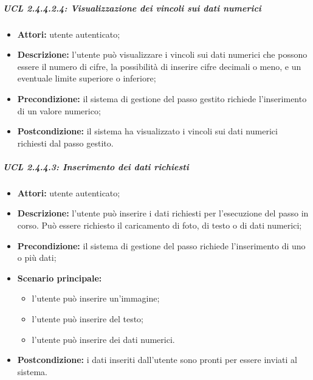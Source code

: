 \subparagraph{UCL 2.4.4.2.4: Visualizzazione dei vincoli sui dati numerici}
\begin{itemize}
\item \textbf{Attori:} utente autenticato;
\item \textbf{Descrizione:} l'utente può visualizzare i vincoli sui dati numerici che possono essere il numero di cifre, la possibilità di inserire cifre decimali o meno, e un eventuale limite superiore o inferiore;
\item \textbf{Precondizione:} il sistema di gestione del passo gestito richiede l'inserimento di un valore numerico;
\item \textbf{Postcondizione:} il sistema ha visualizzato i vincoli sui dati numerici richiesti dal passo gestito.
\end{itemize}

\subparagraph{UCL 2.4.4.3: Inserimento dei dati richiesti}
\begin{itemize}
\item \textbf{Attori:} utente autenticato;
\item \textbf{Descrizione:} l'utente può inserire i dati richiesti per l'esecuzione del passo in corso. Può essere richiesto il caricamento di foto, di testo o di dati numerici; 
\item \textbf{Precondizione:} il sistema di gestione del passo richiede l'inserimento di uno o più dati;
\item \textbf{Scenario principale:}
\begin{itemize}
\item l'utente può inserire un'immagine;
\item l'utente può inserire del testo;
\item l'utente può inserire dei dati numerici.
\end{itemize}
\item \textbf{Postcondizione:} i dati inseriti dall'utente sono pronti per essere inviati al sistema.
\end{itemize}


